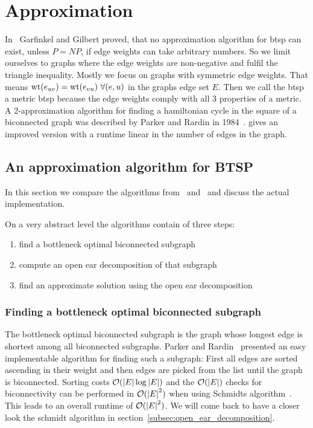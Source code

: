\chapter{Approximation}

In~\cite{garfinkel1978} Garfinkel and Gilbert proved, that no approximation algorithm for \gls{btsp} can exist, unless \(P = NP\), if edge weights can take arbitrary numbers. So we limit ourselves to graphs where the edge weights are non-negative and fulfil the triangle inequality. Mostly we focus on graphs with symmetric edge weights. That means \(\textrm{wt}(e_{uv}) = \textrm{wt}(e_{vu}) \,\, \forall (e,u)\) in the graphs edge set \(E\). Then we call the \gls{btsp} a metric \gls{btsp} because the edge weights comply with all 3 properties of a metric.
A 2-approximation algorithm for finding a hamiltonian cycle in the square of a biconnected graph was described by Parker and Rardin in 1984~\cite{ParkerRardin1984}. \cite{alstrup2018hamiltonian} gives an improved version with a runtime linear in the number of edges in the graph.

\section{An approximation algorithm for BTSP}
In this section we compare the algorithms from~\cite{ParkerRardin1984} and~\cite{alstrup2018hamiltonian} and discuss the actual implementation.

On a very abstract level the algorithms contain of three steps:
\begin{enumerate}[label={Step \arabic*:}, wide = 1em, leftmargin = 3em]
  \item find a bottleneck optimal biconnected subgraph
  \item compute an open ear decomposition of that subgraph
  \item find an approximate solution using the open ear decomposition\label{enum:approximate}
\end{enumerate}

\subsection{Finding a bottleneck optimal biconnected subgraph}
The bottleneck optimal biconnected subgraph is the graph whose longest edge is shortest among all biconnected subgraphs.
Parker and Rardin~\cite{ParkerRardin1984} presented an easy implementable algorithm for finding such a subgraph: First all edges are sorted ascending in their weight and then edges are picked from the list until the graph is biconnected. Sorting costs \(\mathcal{O}({\vert E \vert} \log {\vert E \vert})\) and the \(\mathcal{O}({\vert E \vert})\) checks for biconnectivity can be performed in \(\mathcal{O}({\vert E \vert}^2)\) when using Schmidts algorithm~\cite{schmidt2013}. This leads to an overall runtime of \(\mathcal{O}({\vert E \vert}^2)\). We will come back to have a closer look the schmidt algorithm in section~\ref{subsec:open_ear_decomposition}.


